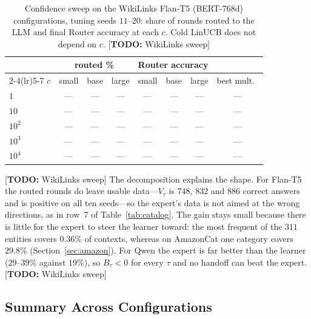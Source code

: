 \documentclass{article}
\theoremstyle{definition}
\theoremstyle{remark}
\theoremstyle{remark}
\newcommand{\todo}[1]{\textcolor{red!70!black}{[\textbf{TODO:} #1]}}
\begin{document}
\begin{table}[h]
\centering
\caption{Confidence sweep on the WikiLinks Flan-T5 (BERT-768d) configurations,
tuning seeds $11$--$20$: share of rounds routed to the LLM and final Router
accuracy at each $c$. Cold LinUCB does not depend on $c$. \todo{WikiLinks sweep}}
\label{tab:wiki-csweep}
\scriptsize
\setlength{\tabcolsep}{4pt}
\begin{tabular}{@{}lccccccc@{}}
\toprule
& \multicolumn{3}{c}{routed \%} & \multicolumn{3}{c}{Router accuracy} & \\
\cmidrule(lr){2-4}\cmidrule(lr){5-7}
$c$ & small & base & large & small & base & large & best mult.\ \\
\midrule
$1$ & --- & --- & --- & --- & --- & --- & --- \\
$10$ & --- & --- & --- & --- & --- & --- & --- \\
$10^2$ & --- & --- & --- & --- & --- & --- & --- \\
$10^3$ & --- & --- & --- & --- & --- & --- & --- \\
$10^4$ & --- & --- & --- & --- & --- & --- & --- \\
\bottomrule
\end{tabular}
\end{table}

\todo{WikiLinks sweep} The decomposition explains the shape. For Flan-T5 the routed rounds do leave
usable data---$V_\tau$ is $748$, $832$ and $886$ correct answers and is
positive on all ten seeds---so the expert's data is not aimed at the wrong
directions, as in row~7 of Table~\ref{tab:catalog}. The gain stays small
because there is little for the expert to steer the learner toward: the most
frequent of the $311$ entities covers $0.36\%$ of contexts, whereas on
AmazonCat one category covers $29.8\%$ (Section~\ref{sec:amazon}). For Qwen the expert is far better than the
learner ($29$--$39\%$ against $19\%$), so $B_\tau<0$ for every $\tau$ and no
handoff can beat the expert. \todo{WikiLinks sweep}

\subsection{Summary Across Configurations}
\label{app:summary}
\end{document}
